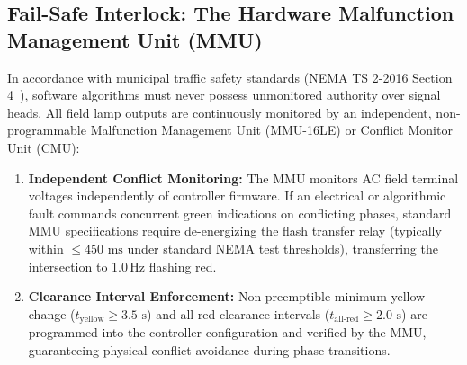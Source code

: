 \documentclass[journal,10pt,twocolumn]{IEEEtran}
\begin{document}
\subsection{Fail-Safe Interlock: The Hardware Malfunction Management Unit (MMU)}
In accordance with municipal traffic safety standards (NEMA TS 2-2016 Section 4~\cite{nema2016}), software algorithms must never possess unmonitored authority over signal heads. All field lamp outputs are continuously monitored by an independent, non-programmable Malfunction Management Unit (MMU-16LE) or Conflict Monitor Unit (CMU):
\begin{enumerate}
    \item \textbf{Independent Conflict Monitoring:} The MMU monitors AC field terminal voltages independently of controller firmware. If an electrical or algorithmic fault commands concurrent green indications on conflicting phases, standard MMU specifications require de-energizing the flash transfer relay (typically within $\le 450\text{ ms}$ under standard NEMA test thresholds), transferring the intersection to 1.0\,Hz flashing red.
    \item \textbf{Clearance Interval Enforcement:} Non-preemptible minimum yellow change ($t_{\text{yellow}} \ge 3.5\text{ s}$) and all-red clearance intervals ($t_{\text{all-red}} \ge 2.0\text{ s}$) are programmed into the controller configuration and verified by the MMU, guaranteeing physical conflict avoidance during phase transitions.
\end{enumerate}
\end{document}
